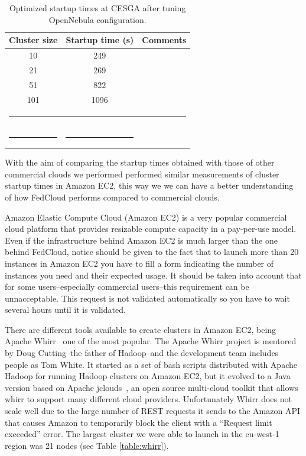 \begin{table}[h!]
\caption{Optimized startup times at CESGA after tuning OpenNebula configuration.}
\label{table:startupON}
%
\vspace{-0.5em}
%
\begin{center}
\begin{tabular}{ccl}
\toprule
Cluster size			& Startup time (s)	& Comments	  \\
\midrule
10                		& 249   		&	 \\
21                   		& 269			&        \\
51                   		& 822 			&        \\
101                  		& 1096			&        \\
%
\bottomrule
\multicolumn{3}{c}{\rule{0.98\textwidth}{0em}}\\
\rule{0.2\textwidth}{0cm} & \rule{0.2\textwidth}{0cm} &  \\
\end{tabular}
\end{center}
\end{table}



With the aim of comparing the startup times obtained with those of other commercial clouds we performed performed similar measurements of cluster startup times in Amazon EC2, this way we we can have a better understanding of how FedCloud performs compared to commercial clouds.

Amazon Elastic Compute Cloud (Amazon EC2) is a very popular commercial cloud platform that provides resizable compute capacity in a pay-per-use model. Even if the infrastructure behind Amazon EC2 is much larger than the one behind FedCloud, notice should be given to the fact that to launch more than 20 instances in Amazon EC2 you have to fill a form indicating the number of instances you need and their expected usage. It should be taken into account that for some users--especially commercial users--this requirement can be unnacceptable. This request is not validated automatically so you have to wait several hours until it is validated.
 
There are different tools available to create clusters in Amazon EC2, being Apache Whirr~\cite{whirr} one of the most popular. The Apache Whirr project is mentored by Doug Cutting--the father of Hadoop--and the development team includes people as Tom White. It started as a set of bash scripts distributed with Apache Hadoop for running Hadoop clusters on Amazon EC2, but it evolved to a Java version based on Apache jclouds~\cite{jclouds}, an open source multi-cloud toolkit that allows whirr to support many different cloud providers. 
Unfortunately Whirr does not scale well due to the large number of REST requests it sends to the Amazon API that causes Amazon to temporarily block the client with a ``Request limit exceeded'' error. The largest cluster we were able to launch in the eu-west-1 region was 21 nodes (see Table \ref{table:whirr}).

